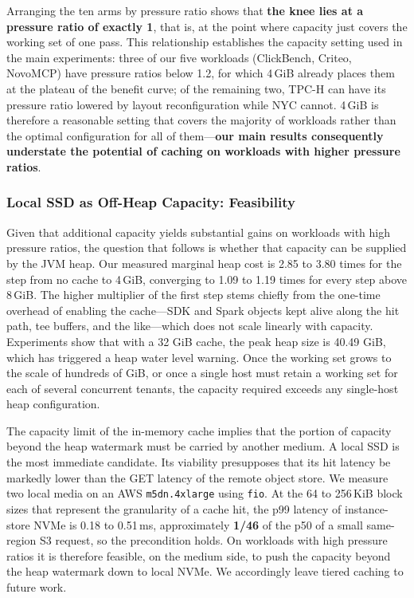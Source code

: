 Arranging the ten arms by pressure ratio shows that \textbf{the knee lies at a
pressure ratio of exactly 1}, that is, at the point where capacity just covers
the working set of one pass. This relationship establishes the capacity setting
used in the main experiments: three of our five workloads (ClickBench, Criteo,
NovoMCP) have pressure ratios below 1.2, for which 4\,GiB already places them at
the plateau of the benefit curve; of the remaining two, TPC-H can have its
pressure ratio lowered by layout reconfiguration while NYC cannot. 4\,GiB is
therefore a reasonable setting that covers the majority of workloads rather than
the optimal configuration for all of them---\textbf{our main results consequently
understate the potential of caching on workloads with higher pressure ratios}.

\subsubsection{Local SSD as Off-Heap Capacity: Feasibility}

Given that additional capacity yields substantial gains on workloads with high
pressure ratios, the question that follows is whether that capacity can be
supplied by the JVM heap. Our measured marginal heap cost is 2.85 to 3.80 times
for the step from no cache to 4\,GiB, converging to 1.09 to 1.19 times for every
step above 8\,GiB. The higher multiplier of the first step stems chiefly from the
one-time overhead of enabling the cache---SDK and Spark objects kept alive along
the hit path, tee buffers, and the like---which does not scale linearly with
capacity. Experiments show that with a 32 GiB cache, the peak heap size is 40.49 GiB, which has triggered a heap water level warning. Once the working set grows to the scale
of hundreds of GiB, or once a single host must retain a working set for each of
several concurrent tenants, the capacity required exceeds any single-host heap
configuration.

The capacity limit of the in-memory cache implies that the portion of capacity
beyond the heap watermark must be carried by another medium. A local SSD is the
most immediate candidate. Its viability presupposes that its hit latency be
markedly lower than the GET latency of the remote object store. We measure two
local media on an AWS \texttt{m5dn.4xlarge} using \texttt{fio}. At the 64 to
256\,KiB block sizes that represent the granularity of a cache hit, the p99
latency of instance-store NVMe is 0.18 to 0.51\,ms, approximately \textbf{1/46}
of the p50 of a small same-region S3 request, so the precondition holds. On
workloads with high pressure ratios it is therefore feasible, on the medium side,
to push the capacity beyond the heap watermark down to local NVMe. We accordingly
leave tiered caching to future work.

